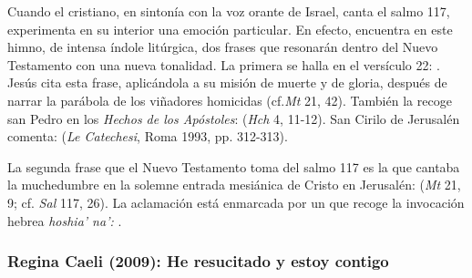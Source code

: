 \begin{patercite}
Cuando el cristiano, en sintonía con la voz orante de Israel, canta el salmo 117, experimenta en su interior una emoción particular. En efecto, encuentra en este himno, de intensa índole litúrgica, dos frases que resonarán dentro del Nuevo Testamento con una nueva tonalidad. La primera se halla en el versículo 22: . Jesús cita esta frase, aplicándola a su misión de muerte y de gloria, después de narrar la parábola de los viñadores homicidas (cf.\emph{Mt} 21, 42). También la recoge san Pedro en los \emph{Hechos de los Apóstoles}:  (\emph{Hch} 4, 11-12). San Cirilo de Jerusalén comenta:  (\emph{Le Catechesi}, Roma 1993, pp. 312-313).

La segunda frase que el Nuevo Testamento toma del salmo 117 es la que cantaba la muchedumbre en la solemne entrada mesiánica de Cristo en Jerusalén:  (\emph{Mt} 21, 9; cf. \emph{Sal} 117, 26). La aclamación está enmarcada por un  que recoge la invocación hebrea \emph{hoshia' na':} .
\end{patercite}

\newpage 


\subsubsection{Regina Caeli (2009): He resucitado y estoy contigo}


